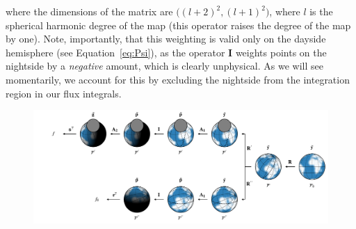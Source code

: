 \documentclass[modern]{aastex62}
\newcommand{\BF}[1]{\ensuremath{\mathbf{#1}}}
\begin{document}
%
where the dimensions of the matrix are $\big((l + 2)^2, (l + 1)^2\big)$, where
$l$ is the spherical harmonic degree of the map (this operator raises the
degree of the map by one).
%
Note, importantly, that this weighting is valid only on the dayside
hemisphere (see Equation~\ref{eq:Psi}), as the operator $\BF{I}$ weights
points on the nightside by a \emph{negative} amount, which is clearly
unphysical. As we will see momentarily, we account for this by excluding the
nightside from the integration region in our flux integrals.

\begin{figure}[t!]
    \begin{centering}
        \includegraphics[width=\linewidth]{figures/frames.pdf}
    \end{centering}
\end{figure}
\end{document}
